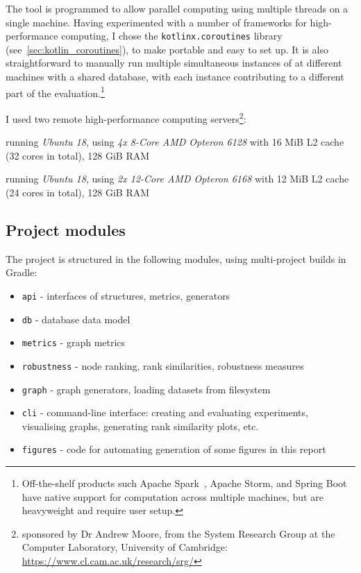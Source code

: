 The \graffs tool is programmed to allow parallel computing using multiple threads on a single machine.
Having experimented with a number of frameworks for high-performance computing, I chose the \texttt{kotlinx.coroutines} library~\cite{TorresLearningConcurrencyKotlin2018} (see~\autoref{sec:kotlin_coroutines}), to make \graffs portable and easy to set up.
It is also straightforward to manually run multiple simultaneous instances of \graffs at different machines with a shared database, with each instance contributing to a different part of the evaluation.\footnote{Off-the-shelf products such Apache Spark~\cite{ZahariaApacheSparkUnified2016}, Apache Storm, and Spring Boot have native support for computation across multiple machines, but are heavyweight and require user setup.}

I used two remote high-performance computing servers\footnote{sponsored by Dr Andrew Moore, from the System Research Group at the Computer Laboratory, University of Cambridge: \url{https://www.cl.cam.ac.uk/research/srg/}}:

\begin{description}[itemsep=-2pt]
    \item[\texttt{rio.cl.cam.ac.uk}] running \textsl{Ubuntu 18}, using \textsl{4x 8-Core AMD Opteron 6128} with 16 MiB L2 cache (32 cores in total), 128 GiB RAM
    \item[\texttt{nile.cl.cam.ac.uk}] running \textsl{Ubuntu 18}, using \textsl{2x 12-Core AMD Opteron 6168} with 12 MiB L2 cache (24 cores in total), 128 GiB RAM
\end{description}

\subsection{Project modules}



The project is structured in the following modules, using multi-project builds in Gradle:
\begin{itemize}[topsep=5pt]
    \item \texttt{api} - interfaces of structures, metrics, generators
    \item \texttt{db} - database data model
    \item \texttt{metrics} - graph metrics
    \item \texttt{robustness} - node ranking, rank similarities, robustness measures
    \item \texttt{graph} - graph generators, loading datasets from filesystem
    \item \texttt{cli} - command-line interface: creating and evaluating experiments, visualising graphs, generating rank similarity plots, etc.
    \item \texttt{figures} - code for automating generation of some figures in this report
\end{itemize}


